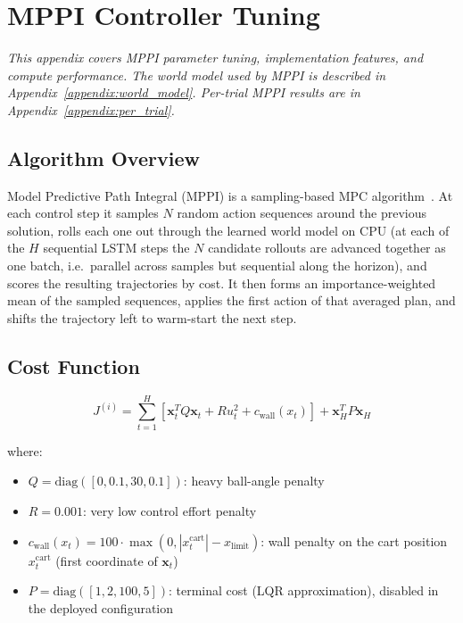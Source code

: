 \section{MPPI Controller Tuning}
\label{appendix:mppi_tuning}

\noindent\textit{This appendix covers MPPI parameter tuning, implementation features,
and compute performance. The world model used by MPPI is described in
Appendix~\ref{appendix:world_model}. Per-trial MPPI results are in
Appendix~\ref{appendix:per_trial}.}

\subsection{Algorithm Overview}

Model Predictive Path Integral (MPPI) is a sampling-based MPC
algorithm~\cite{hewing2020learning,williams2017mppi}. At each control step it
samples $N$ random action sequences around the previous solution, rolls each
one out through the learned world model on CPU (at each of the $H$ sequential
LSTM steps the $N$ candidate rollouts are advanced together as one batch,
i.e.\ parallel across samples but sequential along the horizon), and scores
the resulting
trajectories by cost. It then forms an
importance-weighted mean of the sampled sequences, applies the first action of
that averaged plan, and shifts the trajectory left to warm-start the next
step.

\subsection{Cost Function}

\begin{equation}\label{eq:mppi_cost}
J^{(i)} = \sum_{t=1}^{H} \left[ \mathbf{x}_t^T Q \mathbf{x}_t + R u_t^2 + c_{\text{wall}}(x_t) \right] + \mathbf{x}_H^T P \mathbf{x}_H
\end{equation}

where:
\begin{itemize}
  \item $Q = \text{diag}([0, 0.1, 30, 0.1])$: heavy ball-angle penalty
  \item $R = 0.001$: very low control effort penalty
  \item $c_{\text{wall}}(x_t) = 100 \cdot \max(0, |x^{\text{cart}}_t| - x_{\text{limit}})$: wall penalty on the cart position $x^{\text{cart}}_t$ (first coordinate of $\mathbf{x}_t$)
  \item $P = \text{diag}([1, 2, 100, 5])$: terminal cost (LQR approximation), disabled in the deployed configuration
\end{itemize}

